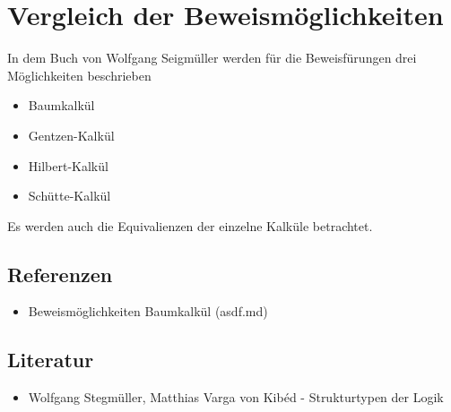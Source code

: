 \documentclass{sajzk}
\begin{document}
\section{Vergleich der Beweismöglichkeiten} 
\label{ed3f.tex}

In dem Buch von Wolfgang Seigmüller werden für die Beweisfürungen drei
Möglichkeiten beschrieben

\begin{itemize}
  \item Baumkalkül
  \item Gentzen-Kalkül
  \item Hilbert-Kalkül
  \item Schütte-Kalkül
\end{itemize}

Es werden auch die Equivalienzen der einzelne Kalküle betrachtet.

\subsection{Referenzen} 
\begin{itemize}
  \item Beweismöglichkeiten Baumkalkül (asdf.md)
\end{itemize}

\subsection{Literatur} 
\begin{itemize}
  \item Wolfgang Stegmüller, Matthias Varga von Kibéd - Strukturtypen der Logik
\end{itemize}
\end{document}

